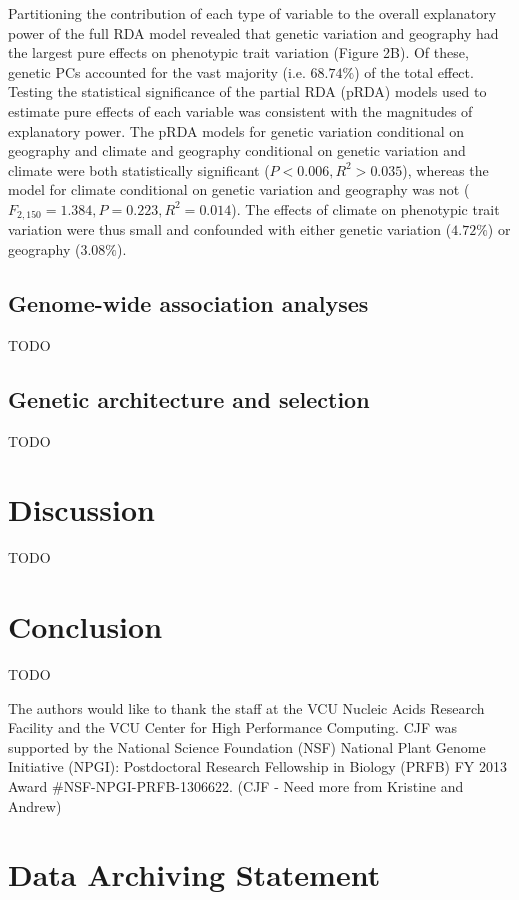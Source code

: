 \documentclass[smallextended]{svjour3}
\begin{document}
Partitioning the contribution of each type of variable to the overall
explanatory power of the full RDA model revealed that
genetic variation and geography had the largest pure effects on phenotypic trait
variation (Figure 2B). Of these, genetic PCs accounted for the vast majority
(i.e. $68.74\%$) of the total effect. Testing the statistical significance of
the partial RDA (pRDA) models used to estimate pure effects of each variable was
consistent with the magnitudes of explanatory power. The pRDA models for genetic
variation conditional on geography and climate and geography conditional on
genetic variation and climate were both statistically significant ($P < 0.006,
R^2 > 0.035$), whereas the model for climate conditional on genetic variation
and geography was not ($F_{2,150} = 1.384, P = 0.223, R^2 = 0.014$). The effects
of climate on phenotypic trait variation were thus small and confounded with
either genetic variation ($4.72\%$) or geography ($3.08\%$).


\subsection*{Genome-wide association analyses}
TODO

\subsection*{Genetic architecture and selection}
TODO

\section*{Discussion}
TODO


\section*{Conclusion}
TODO


\begin{acknowledgements} The authors would like to thank the staff at
the VCU Nucleic Acids Research Facility and the
VCU Center for High Performance Computing.  CJF was supported by the National
Science Foundation (NSF) National Plant Genome Initiative (NPGI): Postdoctoral
Research Fellowship in Biology (PRFB) FY 2013 Award \#NSF-NPGI-PRFB-1306622.
(CJF - Need more from Kristine and Andrew)
\end{acknowledgements}

\section*{Data Archiving Statement}
\end{document}

